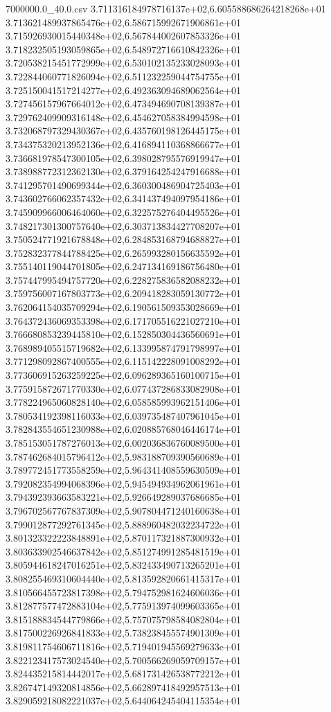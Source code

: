 \begin{filecontents*}{7000000.0_40.0.csv}
3.711316184978716137e+02,6.605588686264218268e+01
3.713621489937865476e+02,6.586715992671906861e+01
3.715926930015440348e+02,6.567844002607853326e+01
3.718232505193059865e+02,6.548972716610842326e+01
3.720538215451772999e+02,6.530102135233028093e+01
3.722844060771826094e+02,6.511232259044754755e+01
3.725150041517214277e+02,6.492363094689062564e+01
3.727456157967664012e+02,6.473494690708139387e+01
3.729762409909316148e+02,6.454627058384994598e+01
3.732068797329430367e+02,6.435760198126445175e+01
3.734375320213952136e+02,6.416894110368866677e+01
3.736681978547300105e+02,6.398028795576919947e+01
3.738988772312362130e+02,6.379164254247916688e+01
3.741295701490699344e+02,6.360300486904725403e+01
3.743602766062357432e+02,6.341437494097954186e+01
3.745909966006464060e+02,6.322575276404495526e+01
3.748217301300757640e+02,6.303713834427708207e+01
3.750524771921678848e+02,6.284853168794688827e+01
3.752832377844788425e+02,6.265993280156635592e+01
3.755140119044701805e+02,6.247134169186756480e+01
3.757447995494757720e+02,6.228275836582088232e+01
3.759756007167803773e+02,6.209418283059130772e+01
3.762064154035709294e+02,6.190561509353028669e+01
3.764372436069353398e+02,6.171705516221027210e+01
3.766680853239445810e+02,6.152850304436560691e+01
3.768989405515719682e+02,6.133995874791798997e+01
3.771298092867400555e+02,6.115142228091008292e+01
3.773606915263259225e+02,6.096289365160100715e+01
3.775915872671770330e+02,6.077437286833082908e+01
3.778224965060828140e+02,6.058585993962151406e+01
3.780534192398116033e+02,6.039735487407961045e+01
3.782843554651230988e+02,6.020885768046446174e+01
3.785153051787276013e+02,6.002036836760089500e+01
3.787462684015796412e+02,5.983188709390560689e+01
3.789772451773558259e+02,5.964341408559630509e+01
3.792082354994068396e+02,5.945494934962061961e+01
3.794392393663583221e+02,5.926649289037686685e+01
3.796702567767837309e+02,5.907804471240160638e+01
3.799012877292761345e+02,5.888960482032234722e+01
3.801323322223848891e+02,5.870117321887300932e+01
3.803633902546637842e+02,5.851274991285481519e+01
3.805944618247016251e+02,5.832433490713265201e+01
3.808255469310604440e+02,5.813592820661415317e+01
3.810566455723817398e+02,5.794752981624606036e+01
3.812877577472883104e+02,5.775913974099603365e+01
3.815188834544779866e+02,5.757075798584082804e+01
3.817500226926841833e+02,5.738238455574901309e+01
3.819811754606711816e+02,5.719401945569279633e+01
3.822123417573024540e+02,5.700566269059709157e+01
3.824435215814442017e+02,5.681731426538772212e+01
3.826747149320814856e+02,5.662897418492957513e+01
3.829059218082221037e+02,5.644064245404115354e+01

\end{filecontents*}

